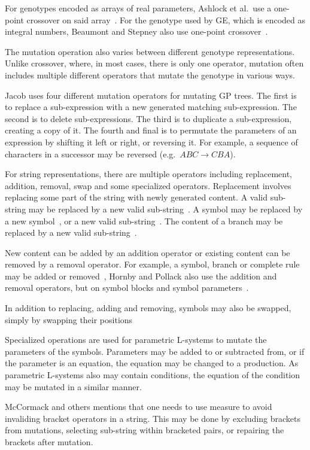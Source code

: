 For genotypes encoded as arrays of real parameters, Ashlock et al.\ use a one-point crossover on said array~\cite{2006Ashlock}.
For the genotype used by \gls{GE}, which is encoded as integral numbers, Beaumont and Stepney also use one-point crossover~\cite{2009Beaumont}.

The mutation operation also varies between different genotype representations.
Unlike crossover, where, in most cases, there is only one operator, mutation often includes multiple different operators that mutate the genotype in various ways.

Jacob uses four different mutation operators for mutating \gls{GP} trees.
The first is to replace a sub-expression with a new generated matching sub-expression.
The second is to delete sub-expressions.
The third is to duplicate a sub-expression, creating a copy of it.
The fourth and final is to permutate the parameters of an expression by shifting it left or right, or reversing it.
For example, a sequence of characters in a successor may be reversed (e.g.\ $ABC \rightarrow CBA$).~\cite{1994Jacob, 1995Jacob}

For string representations, there are multiple operators including replacement, addition, removal, swap and some specialized operators.
Replacement involves replacing some part of the string with newly generated content.
A valid sub-string may be replaced by a new valid sub-string~\cite{1998Mock, 2009Corchado}.
A symbol may be replaced by a new symbol~\cite{2001Hornby, 2002Ebner, 2003Ebner, 2009Corchado, 2013Ding}, or a new valid sub-string~\cite{1998Ochoa}.
The content of a branch may be replaced by a new valid sub-string~\cite{1998Ochoa}.

New content can be added by an addition operator or existing content can be removed by a removal operator.
For example, a symbol, branch or complete rule may be added or removed~\cite{2002Ebner, 2003Ebner},
Hornby and Pollack also use the addition and removal operators, but on symbol blocks and symbol parameters~\cite{2001Hornby}.

In addition to replacing, adding and removing, symbols may also be swapped, simply by swapping their positions~\cite{2002Ebner, 2003Ebner}

Specialized operations are used for parametric \glspl{L-system} to mutate the parameters of the symbols.
Parameters may be added to or subtracted from, or if the parameter is an equation, the equation may be changed to a production.
As parametric \glspl{L-system} also may contain conditions, the equation of the condition may be mutated in a similar manner.~\cite{2001Hornby}

McCormack and others mentions that one needs to use measure to avoid invaliding bracket operators in a string.
This may be done by excluding brackets from mutations, selecting sub-string within bracketed pairs, or repairing the brackets after mutation.~\cite{2004McCormack}


